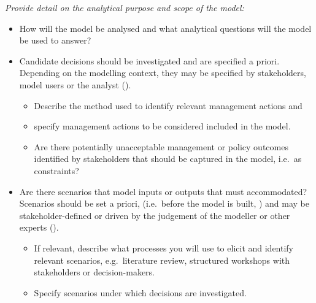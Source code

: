 \documentclass[
]{article}
\providecommand{\tightlist}{%
  \setlength{\itemsep}{0pt}\setlength{\parskip}{0pt}}
\begin{document}
\begin{tcolorbox}[enhanced jigsaw, opacitybacktitle=0.6, bottomrule=.15mm, leftrule=.75mm, rightrule=.15mm, colbacktitle=quarto-callout-caution-color!10!white, toprule=.15mm, titlerule=0mm, left=2mm, colframe=quarto-callout-caution-color-frame, breakable, title=\textcolor{quarto-callout-caution-color}{\faFire}\hspace{0.5em}{Preregistration Item}, opacityback=0, coltitle=black, bottomtitle=1mm, colback=white, toptitle=1mm, arc=.35mm]

\emph{Provide detail on the analytical purpose and scope of the model:}

\begin{itemize}
\tightlist
\item[$\square$]
  How will the model be analysed and what analytical questions will the
  model be used to answer?
\item[$\square$]
  Candidate decisions should be investigated and are specified a priori.
  Depending on the modelling context, they may be specified by
  stakeholders, model users or the analyst
  ().

  \begin{itemize}
  \tightlist
  \item[$\square$]
    Describe the method used to identify relevant management actions and
  \item[$\square$]
    specify management actions to be considered included in the model.
  \item[$\square$]
    Are there potentially unacceptable management or policy outcomes
    identified by stakeholders that should be captured in the model,
    i.e.~as constraints?
  \end{itemize}
\item[$\square$]
  Are there scenarios that model inputs or outputs that must
  accommodated? Scenarios should be set a priori, (i.e.~before the model
  is built, ) and may
  be stakeholder-defined or driven by the judgement of the modeller or
  other experts ().

  \begin{itemize}
  \tightlist
  \item[$\square$]
    If relevant, describe what processes you will use to elicit and
    identify relevant scenarios, e.g.~literature review, structured
    workshops with stakeholders or decision-makers.
  \item[$\square$]
    Specify scenarios under which decisions are investigated.
  \end{itemize}
\end{itemize}

\end{tcolorbox}
\end{document}
